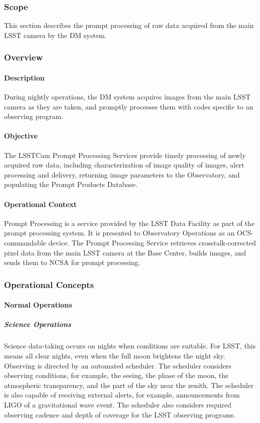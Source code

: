 \subsubsection{Scope}
This section describes the prompt processing of raw data acquired from the main
LSST camera by the DM system.

\subsubsection{Overview}

\paragraph{Description}
During nightly operations, the DM system acquires images from the main LSST
camera as they are taken, and promptly processes them with codes specific to an
observing program.

\paragraph{Objective}
The LSSTCam Prompt Processing Services provide timely processing of newly
acquired raw data, including characterization of image quality of images, alert processing and delivery,
returning image parameters to the Observatory, and populating the Prompt Products
Database.

\paragraph{Operational Context}
Prompt Processing is a service provided by the LSST Data Facility as part of the
prompt processing system. It is presented to Observatory Operations as an OCS-commandable
device. The Prompt Processing Service retrieves crosstalk-corrected pixel data
from the main LSST camera at the Base Center, builds images, and sends them
to NCSA for prompt processing.

\subsubsection{Operational Concepts}

\paragraph{Normal Operations}

\subparagraph{Science Operations}

Science data-taking occurs on nights when conditions are suitable. For
LSST, this means all clear nights, even when the full moon brightens
the night sky. Observing is directed by an automated scheduler. The
scheduler considers observing conditions, for example, the seeing, the
phase of the moon, the atmospheric transparency, and the part of the
sky near the zenith. The scheduler is also capable of receiving
external alerts, for example, announcements from LIGO of a
gravitational wave event. The scheduler also considers required
observing cadence and depth of coverage for the LSST observing
programs.

